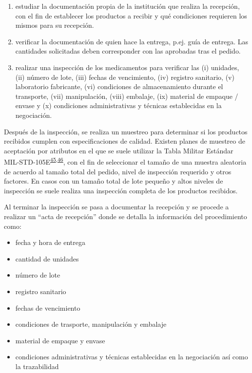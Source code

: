 \documentclass[
]{book}
\begin{document}
\begin{enumerate}
\def\labelenumi{\arabic{enumi}.}
\item
  estudiar la documentación propia de la institución que realiza la recepción, con el fin de establecer los productos a recibir y qué condiciones requieren los mismos para su recepción.
\item
  verificar la documentación de quien hace la entrega, p.ej. guía de entrega. Las cantidades solicitadas deben corresponder con las aprobadas tras el pedido.
\item
  realizar una inspección de los medicamentos para verificar las (i) unidades, (ii) número de lote, (iii) fechas de vencimiento, (iv) registro sanitario, (v) laboratorio fabricante, (vi) condiciones de almacenamiento durante el transporte, (vii) manipulación, (viii) embalaje, (ix) material de empaque / envase y (x) condiciones administrativas y técnicas establecidas en la negociación.
\end{enumerate}

Después de la inspección, se realiza un muestreo para determinar si los productos recibidos cumplen con especificaciones de calidad. Existen planes de muestreo de aceptación por atributos en el que se suele utilizar la Tabla Militar Estándar MIL-STD-105E\textsuperscript{\protect\hyperlink{ref-AmericanNationalStandardsInstitute2013}{45},\protect\hyperlink{ref-GutierrezPulido2008}{46}}, con el fin de seleccionar el tamaño de una muestra aleatoria de acuerdo al tamaño total del pedido, nivel de inspección requerido y otros factores. En casos con un tamaño total de lote pequeño y altos niveles de inspección se suele realiza una inspección completa de los productos recibidos.

Al terminar la inspección se pasa a documentar la recepción y se procede a realizar un ``acta de recepción'' donde se detalla la información del procedimiento como:

\begin{itemize}
\item
  fecha y hora de entrega
\item
  cantidad de unidades
\item
  número de lote
\item
  registro sanitario
\item
  fechas de vencimiento
\item
  condiciones de trasporte, manipulación y embalaje
\item
  material de empaque y envase
\item
  condiciones administrativas y técnicas establecidas en la negociación así como la trazabilidad
\end{itemize}
\end{document}

